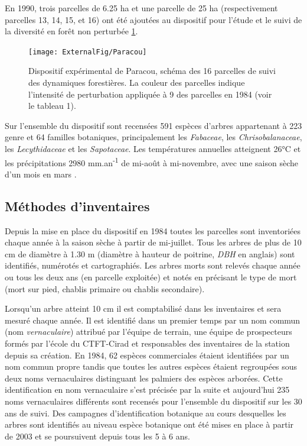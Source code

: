 \documentclass[
  11pt,
  french,
  A4paper,
  extrafontsizes,onecolumn,openright
  ]{memoir}
\begin{document}
\endgroup{}

En 1990, trois parcelles de 6.25 ha et une parcelle de 25 ha
(respectivement parcelles 13, 14, 15, et 16) ont été ajoutées au
dispositif pour l'étude et le suivi de la diversité en forêt non
perturbée \ref{fig:ParacouDesign}.

\begin{figure}

{\centering \texttt{[image: ExternalFig/Paracou]} 

}

\caption{Dispositif expérimental de Paracou, schéma des 16 parcelles de suivi des dynamiques forestières. La couleur des parcelles indique l'intensité de perturbation appliquée à 9 des parcelles en 1984 (voir le tableau 1).}\label{fig:ParacouDesign}
\end{figure}

Sur l'ensemble du dispositif sont recensées 591 espèces d'arbres
appartenant à 223 genre et 64 familles botaniques, principalement les
\emph{Fabaceae}, les \emph{Chrisobalanaceae}, les \emph{Lecythidaceae}
et les \emph{Sapotaceae}. Les températures annuelles atteignent 26°C et
les précipitations 2980 mm.an\textsuperscript{-1} de mi-août à
mi-novembre, avec une saison sèche d'un mois en mars
\autocite{Wagner2011}.

\subsection{Méthodes d'inventaires}\label{methodes-dinventaires}

Depuis la mise en place du dispositif en 1984 toutes les parcelles sont
inventoriées chaque année à la saison sèche à partir de mi-juillet. Tous
les arbres de plus de 10 cm de diamètre à 1.30 m (diamètre à hauteur de
poitrine, \emph{DBH} en anglais) sont identifiés, numérotés et
cartographiés. Les arbres morts sont relevés chaque année ou tous les
deux ans (en parcelle exploitée) et notés en précisant le type de mort
(mort sur pied, chablis primaire ou chablis secondaire).

Lorsqu'un arbre atteint 10 cm il est comptabilisé dans les inventaires
et sera mesuré chaque année. Il est identifié dans un premier temps par
un nom commun (nom \emph{vernaculaire}) attribué par l'équipe de
terrain, une équipe de prospecteurs formés par l'école du CTFT-Cirad et
responsables des inventaires de la station depuis sa création. En 1984,
62 espèces commerciales étaient identifiées par un nom commun propre
tandis que toutes les autres espèces étaient regroupées sous deux noms
vernaculaires distinguant les palmiers des espèces arborées. Cette
identification en nom vernaculaire s'est précisée par la suite et
aujourd'hui 235 noms vernaculaires différents sont recensés pour
l'ensemble du dispositif sur les 30 ans de suivi. Des campagnes
d'identification botanique au cours desquelles les arbres sont
identifiés au niveau espèce botanique ont été mises en place à partir de
2003 et se poursuivent depuis tous les 5 à 6 ans.
\end{document}
